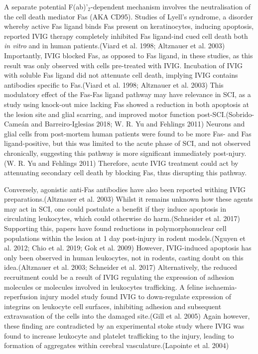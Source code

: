 \documentclass[9pt,lineno]{elife}
\begin{document}
A separate potential F(ab)'\(_2\)-dependent mechanism involves the neutralisation of the cell death mediator Fas (AKA CD95).
Studies of Lyell's syndrome, a disorder whereby active Fas ligand binds Fas present on keratinocytes, inducing apoptosis, reported IVIG therapy completely inhibited Fas ligand-ind cued cell death both \emph{in vitro} and in human patients.(Viard et al. 1998; Altznauer et al. 2003)
Importantly, IVIG blocked Fas, as opposed to Fas ligand, in these studies, as this result was only observed with cells pre-treated with IVIG.
Incubation of IVIG with soluble Fas ligand did not attenuate cell death, implying IVIG contains antibodies specific to Fas.(Viard et al. 1998; Altznauer et al. 2003)
This modulatory effect of the Fas-Fas ligand pathway may have relevance in SCI, as a study using knock-out mice lacking Fas showed a reduction in both apoptosis at the lesion site and glial scarring, and improved motor function post-SCI.(Sobrido-Cameán and Barreiro-Iglesias 2018; W. R. Yu and Fehlings 2011)
Neurons and glial cells from post-mortem human patients were found to be more Fas- and Fas ligand-positive, but this was limited to the acute phase of SCI, and not observed chronically, suggesting this pathway is more significant immediately post-njury.(W. R. Yu and Fehlings 2011)
Therefore, acute IVIG treatment could act by attenuating secondary cell death by blocking Fas, thus disrupting this pathway.

Conversely, agonistic anti-Fas antibodies have also been reported withing IVIG preparations.(Altznauer et al. 2003)
Whilst it remains unknown how these agents may act in SCI, one could postulate a benefit if they induce apoptosis in circulating leukocytes, which could otherwise do harm.(Schneider et al. 2017)
Supporting this, papers have found reductions in polymorphonuclear cell populations within the lesion at 1 day post-injury in rodent models.(Nguyen et al. 2012; Chio et al. 2019; Gok et al. 2009)
However, IVIG-induced apoptosis has only been observed in human leukocytes, not in rodents, casting doubt on this idea.(Altznauer et al. 2003; Schneider et al. 2017)
Alternatively, the reduced recruitment could be a result of IVIG regulating the expression of adhesion molecules or molecules involved in leukocytes trafficking.
A feline ischaemia-reperfusion injury model study found IVIG to down-regulate expression of integrins on leukocyte cell surfaces, inhibiting adhesion and subsequent extravasation of the cells into the damaged site.(Gill et al. 2005)
Again however, these finding are contradicted by an experimental stoke study where IVIG was found to increase leukocyte and platelet trafficking to the injury, leading to formation of aggregates within cerebral vasculature.(Lapointe et al. 2004)
\end{document}
